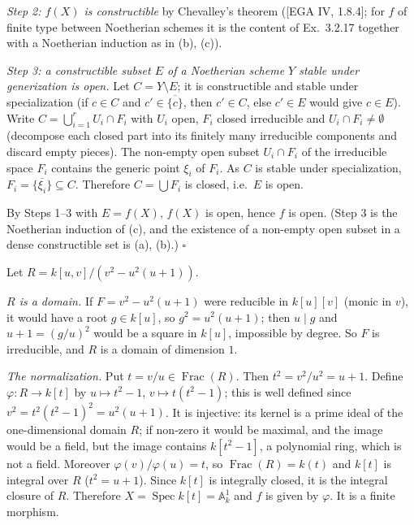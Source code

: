 \documentclass[11pt]{article}
\begin{document}
\emph{Step 2: $f(X)$ is constructible} by Chevalley's theorem ([EGA IV, 1.8.4]; for $f$ of finite type between Noetherian schemes it is the content of Ex.~3.2.17 together with a Noetherian induction as in (b), (c)).

\emph{Step 3: a constructible subset $E$ of a Noetherian scheme $Y$ stable under generization is open.} Let $C=Y\setminus E$; it is constructible and stable under specialization (if $c\in C$ and $c'\in\overline{\{c\}}$, then $c'\in C$, else $c'\in E$ would give $c\in E$). Write $C=\bigcup_{i=1}^rU_i\cap F_i$ with $U_i$ open, $F_i$ closed irreducible and $U_i\cap F_i\neq\emptyset$ (decompose each closed part into its finitely many irreducible components and discard empty pieces). The non-empty open subset $U_i\cap F_i$ of the irreducible space $F_i$ contains the generic point $\xi_i$ of $F_i$. As $C$ is stable under specialization, $F_i=\overline{\{\xi_i\}}\subseteq C$. Therefore $C=\bigcup F_i$ is closed, i.e.\ $E$ is open.

By Steps 1--3 with $E=f(X)$, $f(X)$ is open, hence $f$ is open. (Step 3 is the Noetherian induction of (c), and the existence of a non-empty open subset in a dense constructible set is (a), (b).) \hfill$\square$

\pf
Let $R=k[u,v]/(v^2-u^2(u+1))$.

\emph{$R$ is a domain.} If $F=v^2-u^2(u+1)$ were reducible in $k[u][v]$ (monic in $v$), it would have a root $g\in k[u]$, so $g^2=u^2(u+1)$; then $u\mid g$ and $u+1=(g/u)^2$ would be a square in $k[u]$, impossible by degree. So $F$ is irreducible, and $R$ is a domain of dimension $1$.

\emph{The normalization.} Put $t=v/u\in\operatorname{Frac}(R)$. Then $t^2=v^2/u^2=u+1$. Define $\varphi:R\to k[t]$ by $u\mapsto t^2-1$, $v\mapsto t(t^2-1)$; this is well defined since $v^2=t^2(t^2-1)^2=u^2(u+1)$. It is injective: its kernel is a prime ideal of the one-dimensional domain $R$; if non-zero it would be maximal, and the image would be a field, but the image contains $k[t^2-1]$, a polynomial ring, which is not a field. Moreover $\varphi(v)/\varphi(u)=t$, so $\operatorname{Frac}(R)=k(t)$ and $k[t]$ is integral over $R$ ($t^2=u+1$). Since $k[t]$ is integrally closed, it is the integral closure of $R$. Therefore $X=\operatorname{Spec}k[t]=\mathbb A^1_k$ and $f$ is given by $\varphi$. It is a finite morphism.
\end{document}
